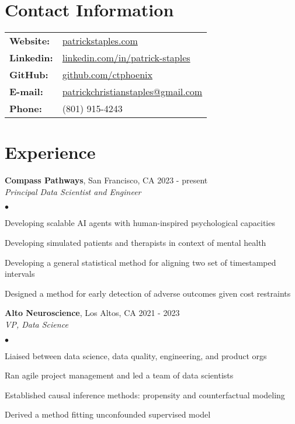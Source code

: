 \documentclass[margin,line]{res}
\newenvironment{bulletlist}{
  \begin{list}{$\bullet$}{%
      \setlength{\itemsep}{0in}
      \setlength{\parsep}{0in}
      \setlength{\parskip}{0in}
      \setlength{\topsep}{0in}
      \setlength{\partopsep}{0in}
      \setlength{\leftmargin}{0.15in}
      \setlength{\labelwidth}{0.05in}
      \setlength{\labelsep}{0.1in}
      \setlength{\itemindent}{0in}
      \setlength{\rightmargin}{0in}}}
  {\end{list}}
\begin{document}

\begin{resume}
\section{\sc Contact Information}
\begin{tabular}{ll}
{\bf Website:} & \url{patrickstaples.com} \\
{\bf Linkedin:} & \href{https://www.linkedin.com/in/patrick-staples}{linkedin.com/in/patrick-staples} \\
{\bf GitHub:}  & \href{https://github.com/ctphoenix}{github.com/ctphoenix} \\
{\bf E-mail:} & \href{mailto:patrickchristianstaples@gmail.com}{patrickchristianstaples@gmail.com} \\
{\bf Phone:}  & (801) 915-4243 \\
\end{tabular}
\section{\sc Experience}
{\bf Compass Pathways}, San Francisco, CA \hfill{2023 - present }\\
\textit{Principal Data Scientist and Engineer} \\[-.35cm]
\begin{bulletlist}
\item Developing scalable AI agents with human-inspired psychological capacities
\item Developing simulated patients and therapists in context of mental health
\item Developing a general statistical method for aligning two set of timestamped intervals
\item Designed a method for early detection of adverse outcomes given cost restraints
\end{bulletlist}

{\bf Alto Neuroscience}, Los Altos, CA \hfill{2021 - 2023 }\\
\textit{VP, Data Science} \\[-.35cm]
\begin{bulletlist}
\item Liaised between data science, data quality, engineering, and product orgs
\item Ran agile project management and led a team of  data scientists
\item Established causal inference methods: propensity and counterfactual modeling
\item Derived a method fitting unconfounded supervised model
\end{bulletlist}
\vspace{-0.1cm}


\end{resume}
\end{document}

